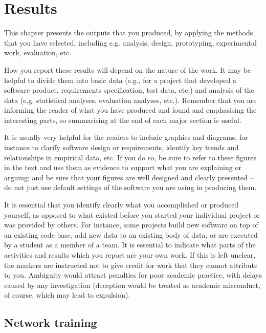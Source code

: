 
\chapter{Results}
\label{Results} 

This chapter presents the outputs that you produced, by applying the methods that you have selected, including e.g. analysis, design, prototyping, experimental work, evaluation, etc.  
  
How you report these results will depend on the nature of the work. It may be helpful to divide them into basic data (e.g., for a project that developed a software product, requirements specification, test data, etc.) and analysis of the data (e.g. statistical analyses, evaluation analyses, etc.). Remember that you are informing the reader of what you have produced and found and emphasising the interesting parts, so summarising at the end of each major section is useful.  
  
It is usually very helpful for the readers to include graphics and diagrams, for instance to clarify software design or requirements, identify key trends and relationships in empirical data, etc. If you do so, be sure to refer to these figures in the text and use them as evidence to support what you are explaining or arguing; and be sure that your figures are well designed and clearly presented – do not just use default settings of the software you are using in producing them.  
  
It is essential that you identify clearly what you accomplished or produced yourself, as opposed to what existed before you started your individual project or was provided by others. For instance, some projects build new software on top of an existing code base, add new data to an existing body of data, or are executed by a student as a member of a team. It is essential to indicate what parts of the activities and results which you report are your own work. If this is left unclear, the markers are instructed not to give credit for work that they cannot attribute to you. Ambiguity would attract penalties for poor academic practice, with delays caused by any investigation (deception would be treated as academic misconduct, of course, which may lead to expulsion).




\section{Network training}

